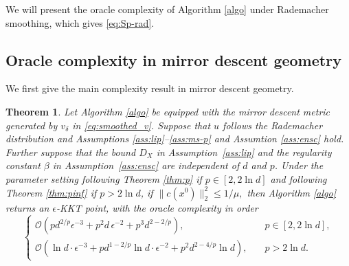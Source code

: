 \documentclass[11pt]{article}
\newtheorem{theorem}{Theorem}[section]
\numberwithin{equation}{section}
\newcommand{\be}{\begin{equation}}
\newcommand{\ee}{\end{equation}}
\begin{document}
We will present the oracle complexity of Algorithm \ref{algo} under Rademacher smoothing, which gives \eqref{eq:Sp-rad}.

\subsection{Oracle complexity in mirror descent geometry}
We first give the main complexity  result in mirror descent geometry.
\begin{theorem}%
\label{thm:rad_qnorm}
Let Algorithm \ref{algo} be equipped with the mirror descent metric
generated by \(v_\delta\) in \eqref{eq:smoothed_v}. Suppose that \(u\) follows the Rademacher
distribution and Assumptions \ref{ass:lip}--\ref{ass:ms-p} and Assumtion \ref{ass:ensc} hold. Further suppose that the bound $D_X$ in Assumption~\ref{ass:lip} and the regularity constant $\beta$ in Assumption~\ref{ass:ensc} are  independent of $d$ and $p$. 
Under the parameter setting following Theorem \ref{thm:p} if
\(p\in[2,2\ln d]\) and following  Theorem \ref{thm:pinf} if
\(p>2\ln d\),  if \(\|c(x^0)\|_2^2\leq 1/\mu,\)
then Algorithm \ref{algo} returns an \(\epsilon\)-KKT point, with the oracle complexity in order
\be\label{R-sm}
\begin{cases}
\mathcal O(p d^{2/p}\epsilon^{-3}
        +
        p^2 d\,\epsilon^{-2}
        +
        p^3 d^{2-2/p}), & \quad p\in[2,2\ln d],\\
\mathcal O(\ln d\cdot\epsilon^{-3}
        +
        p d^{1-2/p}\ln d\cdot\epsilon^{-2} +
        p^2 d^{2-4/p}\ln d),& \quad p>2\ln d.
\end{cases}
\ee

\end{theorem}
\end{document}
